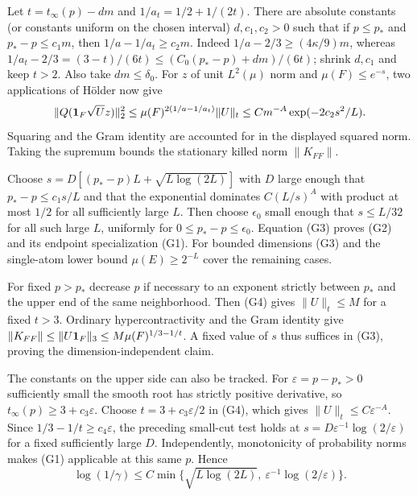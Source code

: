 Let $t=t_\infty(p)-d m$ and $1/a_t=1/2+1/(2t)$.
There are absolute constants (or constants uniform on the chosen interval)
$d,c_1,c_2>0$ such that if $p\le p_*$ and $p_*-p\le c_1 m$, then
$1/a-1/a_t\ge c_2 m$. Indeed $1/a-2/3\ge(4\kappa/9)m$,
whereas $1/a_t-2/3=(3-t)/(6t)\le(C_0(p_*-p)+dm)/(6t)$;
shrink $d,c_1$ and keep $t>2$. Also take $dm\le\delta_0$.
For $z$ of unit $L^2(\mu)$ norm and $\mu(F)\le e^{-s}$, two applications
of H\"older now give
\[
 \|Q({\bf1}_F\sqrt U z)\|_2^2
 \le \mu(F)^{2(1/a-1/a_t)}\|U\|_t
 \le C m^{-A}\exp(-2c_2 s^2/L).
\]
Squaring and the Gram identity are accounted for in the displayed
squared norm. Taking the supremum bounds the stationary killed norm
$\|K_{FF}\|$.

Choose $s=D[(p_*-p)L+\sqrt{L\log(2L)}]$ with $D$ large enough that
$p_*-p\le c_1s/L$ and that the exponential dominates $C(L/s)^A$ with
product at most $1/2$ for all sufficiently large $L$. Then choose
$\epsilon_0$ small enough that $s\le L/32$ for all such large $L$,
uniformly for $0\le p_*-p\le\epsilon_0$. Equation (G3) proves (G2)
and its endpoint specialization (G1). For bounded dimensions (G3) and
the single-atom lower bound $\mu(E)\ge2^{-L}$ cover the remaining cases.

For fixed $p>p_*$ decrease $p$ if necessary to an exponent strictly
between $p_*$ and the upper end of the same neighborhood. Then (G4)
gives $\|U\|_t\le M$ for a fixed $t>3$. Ordinary hypercontractivity
and the Gram identity give $\|K_{FF}\|\le\|U{\bf1}_F\|_3
\le M\mu(F)^{1/3-1/t}$. A fixed value of $s$ thus suffices in (G3),
proving the dimension-independent claim.

The constants on the upper side can also be tracked. For
$\varepsilon=p-p_*>0$ sufficiently small the smooth root has strictly
positive derivative, so $t_\infty(p)\ge3+c_3\varepsilon$.
Choose $t=3+c_3\varepsilon/2$ in (G4), which gives
$\|U\|_t\le C\varepsilon^{-A}$. Since $1/3-1/t\ge c_4\varepsilon$,
the preceding small-cut test holds at
$s=D\varepsilon^{-1}\log(2/\varepsilon)$ for a fixed sufficiently large
$D$. Independently, monotonicity of probability norms makes (G1)
applicable at this same $p$. Hence
\[
 \log(1/\gamma)\le C\min\{\sqrt{L\log(2L)},
                 \ \varepsilon^{-1}\log(2/\varepsilon)\}.
\]

